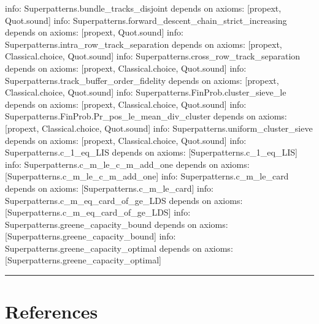 \documentclass[
  11pt,
]{article}
\newenvironment{Shaded}{}{}
\newcommand{\NormalTok}[1]{#1}
\begin{document}
\begin{Shaded}
\begin{Highlighting}[]
\NormalTok{info: Superpatterns.bundle\_tracks\_disjoint depends on axioms: [propext, Quot.sound]}
\NormalTok{info: Superpatterns.forward\_descent\_chain\_strict\_increasing depends on axioms: [propext, Quot.sound]}
\NormalTok{info: Superpatterns.intra\_row\_track\_separation depends on axioms: [propext, Classical.choice, Quot.sound]}
\NormalTok{info: Superpatterns.cross\_row\_track\_separation depends on axioms: [propext, Classical.choice, Quot.sound]}
\NormalTok{info: Superpatterns.track\_buffer\_order\_fidelity depends on axioms: [propext, Classical.choice, Quot.sound]}
\NormalTok{info: Superpatterns.FinProb.cluster\_sieve\_le depends on axioms: [propext, Classical.choice, Quot.sound]}
\NormalTok{info: Superpatterns.FinProb.Pr\_pos\_le\_mean\_div\_cluster depends on axioms: [propext, Classical.choice, Quot.sound]}
\NormalTok{info: Superpatterns.uniform\_cluster\_sieve depends on axioms: [propext, Classical.choice, Quot.sound]}
\NormalTok{info: Superpatterns.c\_1\_eq\_LIS depends on axioms: [Superpatterns.c\_1\_eq\_LIS]}
\NormalTok{info: Superpatterns.c\_m\_le\_c\_m\_add\_one depends on axioms: [Superpatterns.c\_m\_le\_c\_m\_add\_one]}
\NormalTok{info: Superpatterns.c\_m\_le\_card depends on axioms: [Superpatterns.c\_m\_le\_card]}
\NormalTok{info: Superpatterns.c\_m\_eq\_card\_of\_ge\_LDS depends on axioms: [Superpatterns.c\_m\_eq\_card\_of\_ge\_LDS]}
\NormalTok{info: Superpatterns.greene\_capacity\_bound depends on axioms: [Superpatterns.greene\_capacity\_bound]}
\NormalTok{info: Superpatterns.greene\_capacity\_optimal depends on axioms: [Superpatterns.greene\_capacity_optimal]}
\end{Highlighting}
\end{Shaded}

\begin{center}\rule{0.5\linewidth}{0.5pt}\end{center}

\section{References}\label{sec:references}
\end{document}
